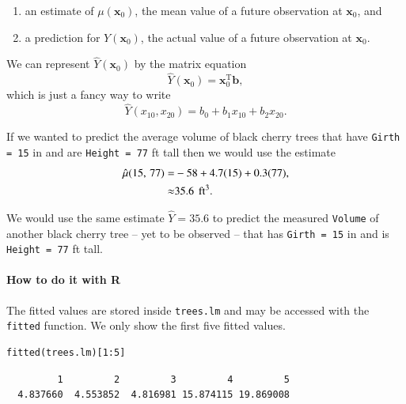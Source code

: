 \documentclass[captions=tableheading]{scrbook}
\begin{document}
\begin{enumerate}
\item an estimate of $\mu(\mathbf{x}_{0})$, the mean value of a future observation at $\mathbf{x}_{0}$, and
\item a prediction for $Y(\mathbf{x}_{0})$, the actual value of a future observation at $\mathbf{x}_{0}$.
\end{enumerate}

We can represent $\hat{Y}(\mathbf{x}_{0})$ by the matrix equation
\begin{equation}
\hat{Y}(\mathbf{x}_{0})=\mathbf{x}_{0}^{\mathrm{T}}\mathbf{b},\label{eq:mlr-single-yhat-matrix}
\end{equation}
which is just a fancy way to write
\begin{equation}
\hat{Y}(x_{10},x_{20})=b_{0}+b_{1}x_{10}+b_{2}x_{20}.
\end{equation}
 
\begin{example}
If we wanted to predict the average volume of black cherry trees that have \texttt{Girth = 15} in and are \texttt{Height = 77} ft tall then we would use the estimate 
\begin{alignat*}{1}
\hat{\mu}(15,\,77)= & -58+4.7(15)+0.3(77),\\
\approx & 35.6\mbox{\,\ ft}^{3}.
\end{alignat*}

We would use the same estimate $\hat{Y}=35.6$ to predict the measured \texttt{Volume} of another black cherry tree -- yet to be observed -- that has \texttt{Girth = 15} in and is \texttt{Height = 77} ft tall.
\end{example}

\paragraph*{How to do it with \textsf{R}}

The fitted values are stored inside \texttt{trees.lm} and may be accessed with the \texttt{fitted} function. We only show the first five fitted values.


\begin{verbatim}
fitted(trees.lm)[1:5]
\end{verbatim}

\begin{verbatim}
         1         2         3         4         5 
  4.837660  4.553852  4.816981 15.874115 19.869008
\end{verbatim}
\end{document}
